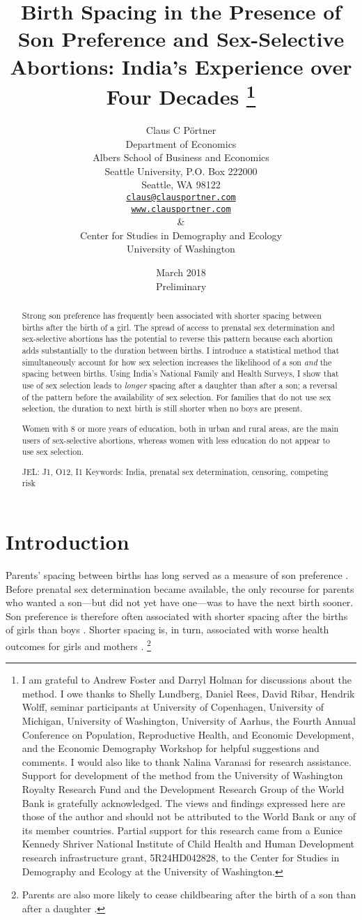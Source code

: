 \documentclass[12pt,letterpaper]{article}
\title{Birth Spacing in the Presence of Son Preference and Sex-Selective Abortions:
India's Experience over Four Decades%
\protect\thanks{%
I am grateful to Andrew Foster and Darryl Holman for discussions about the method.
I owe thanks to Shelly Lundberg, Daniel Rees, David Ribar, 
Hendrik Wolff, seminar participants at University of Copenhagen, University of Michigan, 
University of Washington, University of Aarhus, the Fourth 
Annual Conference on Population, Reproductive Health, 
and Economic Development, and the Economic Demography Workshop for helpful 
suggestions and comments.
I would also like to thank Nalina Varanasi for research assistance.
Support for development of the method from the University of Washington Royalty 
Research Fund and the Development Research Group of the World Bank is gratefully 
acknowledged.
The views and findings expressed here are those of the author and
should not be attributed to the World Bank or any of its member countries.
Partial support for this research came from a Eunice Kennedy Shriver National
Institute of Child Health and Human Development research infrastructure grant,
5R24HD042828, to the Center for Studies in Demography and Ecology at the
University of Washington.
}
}
\author{Claus C P\"ortner\\
    Department of Economics\\
    Albers School of Business and Economics\\
    Seattle University, P.O. Box 222000\\
    Seattle, WA 98122\\
    \href{mailto:claus@clausportner.com}{\texttt{claus@clausportner.com}}\\
    \href{http://www.clausportner.com}{\texttt{www.clausportner.com}}\\
    \& \\
    Center for Studies in Demography and Ecology \\
    University of Washington\\ \vspace{2cm}
    }
\date{March 2018\\
\bigskip
Preliminary}
\begin{document}
\graphicspath{{../figures/}}

\setcounter{page}{-1}
\maketitle
\thispagestyle{empty}



\newpage
\thispagestyle{empty}
\doublespacing

\begin{abstract}

\noindent 

Strong son preference has frequently been associated with shorter 
spacing between births after the birth of a girl.
The spread of access to prenatal sex determination and 
sex-selective abortions has the potential to reverse this pattern
because each abortion adds substantially to the duration between births.
I introduce a statistical method that simultaneously account for how sex 
selection increases the likelihood of a son \emph{and} the spacing between births.
Using India's National Family and Health Surveys,
I show that use of sex selection leads to \emph{longer} spacing after a daughter 
than after a son; a reversal of the pattern before the availability of sex selection.
For families that do not use sex selection, the duration to next birth is still 
shorter when no boys are present.

Women with 8 or more years of education, both in urban and rural areas, are 
the main users of sex-selective abortions, whereas women with less education 
do not appear to use sex selection.


\noindent JEL: J1, O12, I1
\noindent Keywords: India, prenatal sex determination, censoring, competing risk
\end{abstract}

\newpage



\section{Introduction\label{sec:intro}}

Parents' spacing between births has long served as a measure of son preference 
\citep{Leung1988}.
Before prenatal sex determination became available, the only recourse for 
parents who wanted a son---but did not yet have one---was to have the next 
birth sooner.
Son preference is therefore often associated with shorter spacing after the 
births of girls than boys 
\citep{Das1987,Rahman1993,Pong1994,Haughton1996,Arnold1997,Soest2012,Rossi2015}.
Shorter spacing is, in turn, associated with worse health outcomes for girls 
and mothers 
\citep{arnold98,Conde-Agudelo2000,Whitworth2002,Razzaque2005,Rutstein2005,Conde-Agudelo2006}.%
\footnote{
Parents are also more likely to cease childbearing after the birth of 
a son than after a daughter 
\citep{repetto72,ben-porath76b,Das1987,Arnold1997,arnold98,clark00,dreze01,filmer09,Basu2010,Altindag2016}.
}
\end{document}
